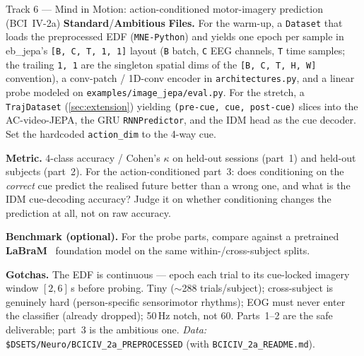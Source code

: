 \documentclass{article}
\newcommand{\code}[1]{\texttt{\small #1}}
\newcommand{\file}[1]{\texttt{\small #1}}
\newcommand{\diffmed}{\colorbox{ebamber!18}{\textcolor{ebamber}{\small\bfseries Standard}}}
\newcommand{\diffhard}{\colorbox{ebred!15}{\textcolor{ebred}{\small\bfseries Ambitious}}}
\begin{document}
\begin{trackbox}{Track 6 --- Mind in Motion: action-conditioned motor-imagery prediction (BCI~IV-2a) \hfill \diffmed{}/\diffhard{}}
\smallskip
\textbf{Files.} For the warm-up, a \code{Dataset} that loads the preprocessed EDF
(\code{MNE-Python}) and yields one epoch per sample in eb\_jepa's \code{[B, C, T, 1, 1]}
layout (\code{B} batch, \code{C} EEG channels, \code{T} time samples; the trailing
\code{1, 1} are the singleton spatial dims of the \code{[B, C, T, H, W]} convention), a
conv-patch / 1D-conv encoder in \file{architectures.py}, and a linear probe modeled on
\file{examples/image\_jepa/eval.py}. For the stretch, a \code{TrajDataset}
(\cref{sec:extension}) yielding \code{(pre-cue, cue, post-cue)} slices into the
AC-video-JEPA, the GRU \code{RNNPredictor}, and the IDM head as the cue decoder. Set the
hardcoded \code{action\_dim} to the 4-way cue.

\smallskip
\textbf{Metric.} 4-class accuracy / Cohen's $\kappa$ on held-out sessions (part~1) and
held-out subjects (part~2). For the action-conditioned part~3: does conditioning on the
\emph{correct} cue predict the realised future better than a wrong one, and what is the
IDM cue-decoding accuracy? Judge it on whether conditioning changes the prediction at
all, not on raw accuracy.

\smallskip
\textbf{Benchmark (optional).} For the probe parts, compare against a pretrained
\textbf{LaBraM}~\citep{LaBraM} foundation model on the same within-/cross-subject splits.

\smallskip
\textbf{Gotchas.} The EDF is continuous --- epoch each trial to its cue-locked imagery
window $[2,6]$\,s before probing. Tiny ($\sim$288 trials/subject); cross-subject is
genuinely hard (person-specific sensorimotor rhythms); EOG must never enter the
classifier (already dropped); 50\,Hz notch, not 60. Parts~1--2 are the safe deliverable;
part~3 is the ambitious one.
\emph{Data:} \code{\$DSETS/Neuro/BCICIV\_2a\_PREPROCESSED} (with
\code{BCICIV\_2a\_README.md}).
\end{trackbox}

\end{document}
